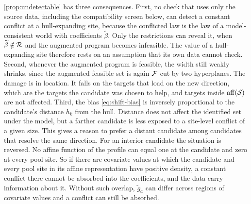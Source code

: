 \cref{prop:undetectable} has three consequences. First, no check that
uses only the source data, including the compatibility screen below, can
detect a constant conflict at a hull-expanding site, because the
conflicted law is the law of a model-consistent world with coefficients
$\widetilde\beta$. Only the restrictions can reveal it, when
$\widetilde\beta\notin\mathcal R$ and the augmented program becomes
infeasible. The value of a hull-expanding site therefore rests on
an assumption that its own data cannot check. Second, whenever the augmented program is feasible, the width still
weakly shrinks, since the augmented feasible set is again $\mathcal F$ cut
by two hyperplanes. The damage is in location. It falls on the targets
that load on the new direction, which are the targets the candidate was
chosen to help, and targets inside $\operatorname{aff}(\mathcal S)$ are not affected.
Third, the bias \eqref{eq:shift-bias} is inversely proportional to the
candidate's distance $h_k$ from the hull. Distance does not affect
the identified set under the model, but a farther candidate is less
exposed to a site-level conflict of a given size. This gives a reason to
prefer a distant candidate among candidates that resolve the same
direction. For an interior candidate the situation is reversed. No
affine function of the profile can equal one at the candidate and zero
at every pool site. So if there are covariate values at which the
candidate and every pool site in its affine representation have positive
density, a constant conflict there cannot be absorbed into the
coefficients, and the data carry information about it. Without such
overlap, $\widetilde g_a$ can differ across regions of covariate values
and a conflict can still be absorbed.


